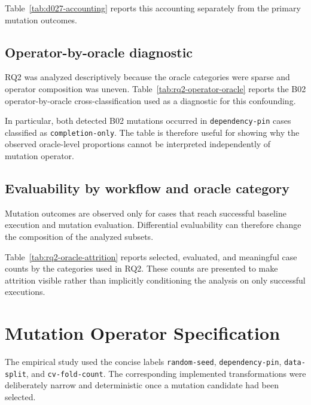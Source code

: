 Table~\ref{tab:d027-accounting} reports this accounting separately from the
primary mutation outcomes.




\subsection{Operator-by-oracle diagnostic}
\label{app:operator-oracle}

RQ2 was analyzed descriptively because the oracle categories were sparse and
operator composition was uneven. Table~\ref{tab:rq2-operator-oracle} reports
the B02 operator-by-oracle cross-classification used as a diagnostic for this
confounding.

In particular, both detected B02 mutations occurred in
\texttt{dependency-pin} cases classified as \texttt{completion-only}. The table
is therefore useful for showing why the observed oracle-level proportions
cannot be interpreted independently of mutation operator.



\FloatBarrier

\subsection{Evaluability by workflow and oracle category}
\label{app:rq2-attrition}

Mutation outcomes are observed only for cases that reach successful baseline
execution and mutation evaluation. Differential evaluability can therefore
change the composition of the analyzed subsets.

Table~\ref{tab:rq2-oracle-attrition} reports selected, evaluated, and meaningful case
counts by the categories used in RQ2. These counts are presented to make
attrition visible rather than implicitly conditioning the analysis on only
successful executions.



\FloatBarrier

\section{Mutation Operator Specification}
\label{app:operator-specification}

The empirical study used the concise labels
\texttt{random-seed},
\texttt{dependency-pin},
\texttt{data-split}, and
\texttt{cv-fold-count}. The corresponding implemented transformations were
deliberately narrow and deterministic once a mutation candidate had been
selected.

